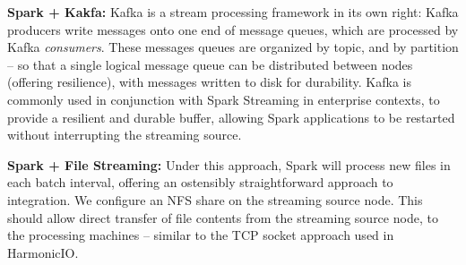 \documentclass[conference]{IEEEtran}
\begin{document}
\textbf{Spark + Kakfa:} Kafka is a stream processing framework in its own right: Kafka producers write messages onto one end of message queues, which are processed by Kafka \emph{consumers}. These messages queues are organized by topic, and by partition -- so that a single logical message queue can be distributed between nodes (offering resilience), with messages written to disk for durability. Kafka is commonly used in conjunction with Spark Streaming in enterprise contexts, to provide a resilient and durable buffer, allowing Spark applications to be restarted without interrupting the streaming source.  

\textbf{Spark + File Streaming:} Under this approach, Spark will process new files in each batch interval, offering an ostensibly straightforward approach to integration. 
We configure an NFS share on the streaming source node. This should allow direct transfer of file contents from the streaming source node, to the processing machines -- similar to the TCP socket approach used in HarmonicIO. 




\end{document}
